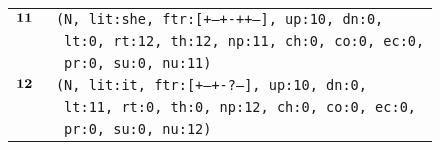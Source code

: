 \documentclass{article}
\begin{document}
\begin{minipage}{\textwidth}
{\begin{tabular}{|r|l|}
    ${\textbf{\textrm{11}}_{\phantom{z}}}$ & \texttt{\texttt{(N,~lit:she,~ftr:[+--+-++--],~up:10,~dn:0,}} \\
    & \texttt{\texttt{~lt:0,~rt:12,~th:12,~np:11,~ch:0,~co:0,~ec:0,}} \\
    & \texttt{\texttt{~pr:0,~su:0,~nu:11)}} \\
    ${\textbf{\textrm{12}}_{\phantom{z}}}$ & \texttt{\texttt{(N,~lit:it,~ftr:[+--+-?---],~up:10,~dn:0,}} \\
    & \texttt{\texttt{~lt:11,~rt:0,~th:0,~np:12,~ch:0,~co:0,~ec:0,}} \\
    & \texttt{\texttt{~pr:0,~su:0,~nu:12)}} \\
    \hline
  \end{tabular}
  }
\end{minipage}
\bigbreak

\bigbreak
\begin{minipage}{\textwidth}
\end{minipage}
\bigbreak
\end{document}
